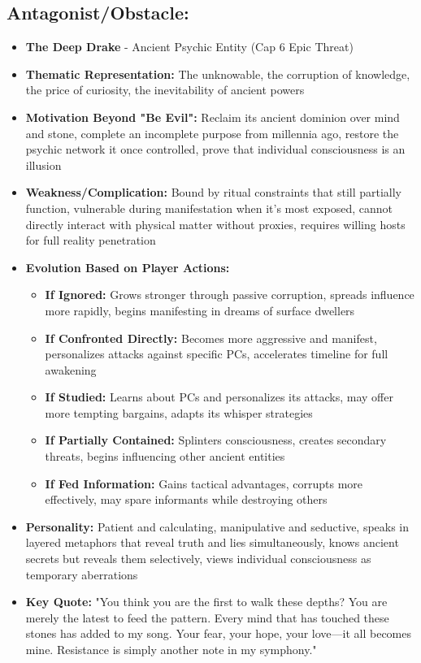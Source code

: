 \documentclass[11pt]{article}
\begin{document}
\subsection{Antagonist/Obstacle:}
\begin{itemize}
\item \textbf{The Deep Drake} - Ancient Psychic Entity (Cap 6 Epic Threat)
  \item \textbf{Thematic Representation:} The unknowable, the corruption of knowledge, the price of curiosity, the inevitability of ancient powers
  \item \textbf{Motivation Beyond "Be Evil":} Reclaim its ancient dominion over mind and stone, complete an incomplete purpose from millennia ago, restore the psychic network it once controlled, prove that individual consciousness is an illusion
  \item \textbf{Weakness/Complication:} Bound by ritual constraints that still partially function, vulnerable during manifestation when it's most exposed, cannot directly interact with physical matter without proxies, requires willing hosts for full reality penetration
  \item \textbf{Evolution Based on Player Actions:}
    \begin{itemize}
    \item \textbf{If Ignored:} Grows stronger through passive corruption, spreads influence more rapidly, begins manifesting in dreams of surface dwellers
    \item \textbf{If Confronted Directly:} Becomes more aggressive and manifest, personalizes attacks against specific PCs, accelerates timeline for full awakening
    \item \textbf{If Studied:} Learns about PCs and personalizes its attacks, may offer more tempting bargains, adapts its whisper strategies
    \item \textbf{If Partially Contained:} Splinters consciousness, creates secondary threats, begins influencing other ancient entities
    \item \textbf{If Fed Information:} Gains tactical advantages, corrupts more effectively, may spare informants while destroying others
    \end{itemize}
  \item \textbf{Personality:} Patient and calculating, manipulative and seductive, speaks in layered metaphors that reveal truth and lies simultaneously, knows ancient secrets but reveals them selectively, views individual consciousness as temporary aberrations
  \item \textbf{Key Quote:} "You think you are the first to walk these depths? You are merely the latest to feed the pattern. Every mind that has touched these stones has added to my song. Your fear, your hope, your love—it all becomes mine. Resistance is simply another note in my symphony."

\end{itemize}
\end{document}
